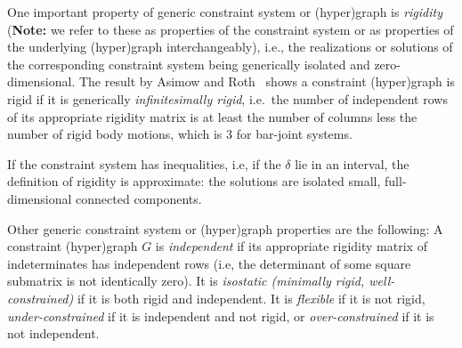 
One important property of generic constraint system or 
(hyper)graph %
is \emph{rigidity} ({\bf Note:} we refer to these as
properties of the constraint system or as properties of the underlying
(hyper)graph interchangeably),
i.e., the realizations or solutions of the corresponding constraint system being generically isolated and zero-dimensional. %
The result by Asimow and Roth~\cite{???} shows a constraint (hyper)graph is rigid
if it is generically {\em infinitesimally rigid}, i.e.\ the number of independent rows of its appropriate rigidity matrix is at least the number of columns less the number of rigid body motions, which is 3 for bar-joint systems. 

 If the constraint system has inequalities, i.e, if the $\delta$ lie in an interval,
the definition of rigidity is approximate: the solutions are isolated small, full-dimensional  connected components.


Other generic constraint system or (hyper)graph properties are the following: %
%
A constraint (hyper)graph $G$ is {\em independent} if its appropriate rigidity matrix of indeterminates  
has independent rows
(i.e, the determinant of some square submatrix is not
identically zero). 
It is {\em isostatic (minimally rigid, well-constrained)} 
if it is both rigid and independent. 
It is {\em flexible} if it is not rigid, {\em under-constrained} if it is independent and not rigid, or {\em over-constrained} if it is not independent.


